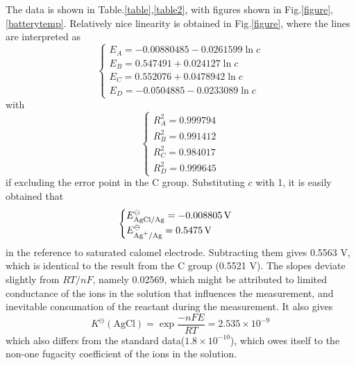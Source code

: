 \documentclass[%
 reprint,
 amsmath,amssymb,
 aps,
10.5pt,
]{revtex4-1}
\begin{document}
The data is shown in Table.\ref{table},\ref{table2}, with figures shown in Fig.\ref{figure},\ref{batterytemp}. Relatively nice linearity is obtained in Fig.\ref{figure}, where the lines are interpreted as
\begin{equation}
\begin{cases}
E_A = -0.00880485 - 0.0261599 \ln{c} \\
E_B = 0.547491 + 0.024127 \ln{c} \\
E_C = 0.552076 + 0.0478942 \ln{c} \\
E_D = -0.0504885 - 0.0233089 \ln{c}
\end{cases}
\end{equation}
with
\begin{equation}
\begin{cases}
R^2_A = 0.999794 \\
R^2_B = 0.991412 \\
R^2_C = 0.984017 \\
R^2_D = 0.999645
\end{cases}
\end{equation}
if excluding the error point in the C group. Substituting $c$ with 1, it is easily obtained that
\begin{equation}
\begin{cases}
E^\ominus_\text{AgCl/Ag} = -0.008805 \, \mathrm{V} \\
E^\ominus_\text{\ce{Ag+}/Ag} = 0.5475 \, \mathrm{V} 
\end{cases}
\end{equation}
in the reference to saturated calomel electrode. Subtracting them gives 0.5563 V, which is identical to the result from the C group (0.5521 V). The slopes deviate slightly from $RT/nF$, namely 0.02569, which might be attributed to limited conductance of the ions in the solution that influences the measurement, and inevitable consumation of the reactant during the measurement. It also gives
\begin{equation}
K^\ominus(\text{AgCl}) = \exp{\frac{-nFE}{RT}} = 2.535 \times 10^{-9}
\end{equation}
which also differs from the standard data($1.8\times 10^{-10}$), which owes itself to the non-one fugacity coefficient of the ions in the solution. 
\end{document}
